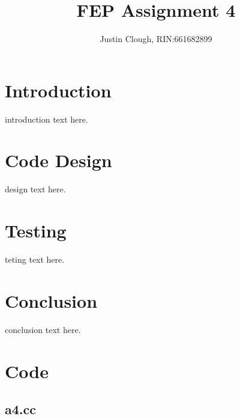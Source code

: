 \documentclass[a4paper, 12pt]{article}
\author{Justin Clough, RIN:661682899}
\title{FEP Assignment 4}
\begin{document}
\maketitle

\section{Introduction} \label{sec:intro}
introduction text here.

\section{Code Design} \label{sec:design}
design text here.

\section{Testing} \label{sec:testing}
teting text here.

\section{Conclusion} \label{sec:conclusion}
conclusion text here.

\newpage
\appendix
\section{Code} \label{sec:code}

\subsection{a4.cc} \label{subsec:main_cpp}


\end{document}

